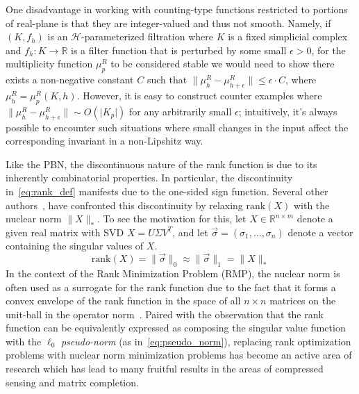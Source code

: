 \documentclass[10pt]{article}
\numberwithin{equation}{section}
\newcommand{\+}{%
	\raisebox{0.18ex}{\scaleobj{0.55}{+}}
}
\theoremstyle{definition}
\begin{document}
One disadvantage in working with counting-type functions restricted to portions of real-plane is that they are integer-valued and thus not smooth. 
Namely, if $(K, f_h)$ is an $\mathcal{H}$-parameterized filtration where $K$ is a fixed simplicial complex and $f_h : K \to \mathbb{R}$ is a filter function that is perturbed by some small $\epsilon > 0$, for the multiplicity function $\mu_p^R$ to be considered stable we would need to show 
there exists a non-negative constant $C$ such that $\lVert \mu_h^R - \mu_{h + \epsilon}^R \rVert \leq \epsilon \cdot C$, where $\mu^R_{h} = \mu_p^R(K,h)$.
However, it is easy to construct counter examples where $\lVert \mu_h^R - \mu_{h + \epsilon}^R \rVert \sim O(\lvert K_p \rvert )$ for any arbitrarily small $\epsilon$;
intuitively, it's always possible to encounter such situations where small changes in the input affect the corresponding invariant in a non-Lipshitz way.
 
Like the PBN, the discontinuous nature of the rank function is due to its inherently combinatorial properties. In particular, the discontinuity in~\eqref{eq:rank_def} manifests due to the one-sided sign function. 
Several other authors~\cite{}, have confronted this discontinuity by relaxing $\mathrm{rank}(X)$ with the nuclear norm $\lVert X\rVert_\ast$. To see the motivation for this, let $X \in \mathbb{R}^{n \times m}$ denote a given real matrix with SVD $X = U \Sigma V^T$, and let $\vec{\sigma} = (\sigma_1, \dots, \sigma_n)$ denote a vector containing the singular values of $X$.  
\begin{equation}\label{eq:pseudo_norm}
	\mathrm{rank}(X) = \lVert \vec{\sigma} \rVert_0  \approx \lVert \vec{\sigma} \rVert_1 = \lVert X \rVert_\ast 
\end{equation}
In the context of the Rank Minimization Problem (RMP), the nuclear norm is often used as a surrogate for the rank function due to the fact that it forms a convex envelope of the rank function in the space of all $n \times n$ matrices on the unit-ball in the operator norm~\cite{}. 
Paired with the observation that the rank function can be equivalently expressed as composing the singular value function with the $\ell_0$ \emph{pseudo-norm} (as in~\eqref{eq:pseudo_norm}), replacing rank optimization problems with nuclear norm minimization problems has become an active area of research which has lead to many fruitful results in the areas of compressed sensing and matrix completion. 
\end{document}
